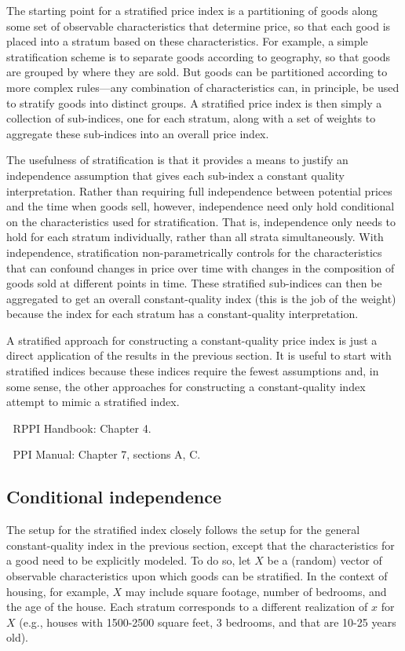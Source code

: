 \documentclass[
]{article}
\begin{document}
The starting point for a stratified price index is a partitioning of goods along some set of observable characteristics that determine price, so that each good is placed into a stratum based on these characteristics. For example, a simple stratification scheme is to separate goods according to geography, so that goods are grouped by where they are sold. But goods can be partitioned according to more complex rules---any combination of characteristics can, in principle, be used to stratify goods into distinct groups. A stratified price index is then simply a collection of sub-indices, one for each stratum, along with a set of weights to aggregate these sub-indices into an overall price index.

The usefulness of stratification is that it provides a means to justify an independence assumption that gives each sub-index a constant quality interpretation. Rather than requiring full independence between potential prices and the time when goods sell, however, independence need only hold conditional on the characteristics used for stratification. That is, independence only needs to hold for each stratum individually, rather than all strata simultaneously. With independence, stratification non-parametrically controls for the characteristics that can confound changes in price over time with changes in the composition of goods sold at different points in time. These stratified sub-indices can then be aggregated to get an overall constant-quality index (this is the job of the weight) because the index for each stratum has a constant-quality interpretation.

A stratified approach for constructing a constant-quality price index is just a direct application of the results in the previous section. It is useful to start with stratified indices because these indices require the fewest assumptions and, in some sense, the other approaches for constructing a constant-quality index attempt to mimic a stratified index.

📖 RPPI Handbook: Chapter 4.

📖 PPI Manual: Chapter 7, sections A, C.

\hypertarget{conditional-independence}{%
\subsection{Conditional independence}\label{conditional-independence}}

The setup for the stratified index closely follows the setup for the general constant-quality index in the previous section, except that the characteristics for a good need to be explicitly modeled. To do so, let \(X\) be a (random) vector of observable characteristics upon which goods can be stratified. In the context of housing, for example, \(X\) may include square footage, number of bedrooms, and the age of the house. Each stratum corresponds to a different realization of \(x\) for \(X\) (e.g., houses with 1500-2500 square feet, 3 bedrooms, and that are 10-25 years old).
\end{document}
